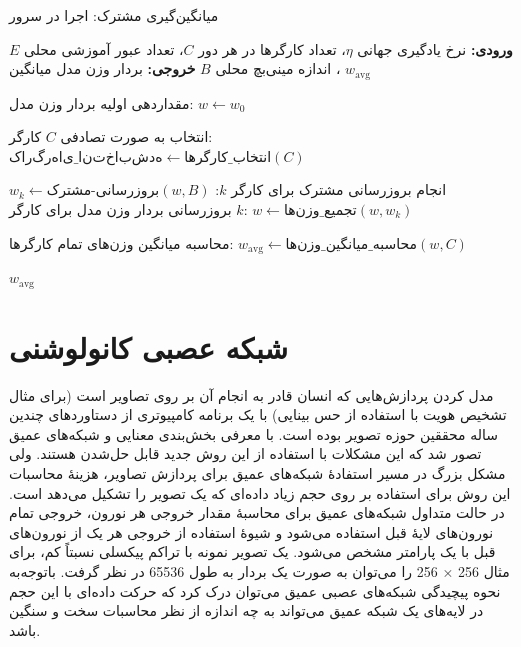       \begin{algorithm}[H]
          \caption{میانگین‌گیری مشترک: اجرا در سرور}
          \label{alg:federated_averaging}
          \begin{algorithmic}[1]
              \State \textbf{ورودی:} نرخ یادگیری جهانی $\eta$، تعداد کارگر‌ها در هر دور $C$، تعداد عبور آموزشی محلی $E$، اندازه مینی‌بچ محلی $B$
              \State \textbf{خروجی:} بردار وزن مدل میانگین $w_{\text{avg}}$
              
                  \State مقداردهی اولیه بردار وزن مدل: $w \gets w_0$
                  
                   
                      \State انتخاب به صورت تصادفی $C$ کارگر: $کارگر‌های\_انتخاب‌شده \gets \text{انتخاب\_کارگر‌ها}(C)$
                      
                          \State انجام بروزرسانی مشترک برای کارگر $k$: $w_k \gets \text{بروزرسانی-مشترک}(w, B)$
                          \State بروزرسانی بردار وزن مدل برای کارگر $k$: $w \gets \text{تجمیع\_وزن‌ها}(w, w_k)$
                      \EndFor
                      
                      \State محاسبه میانگین وزن‌های تمام کارگر‌ها: $w_{\text{avg}} \gets \text{محاسبه\_میانگین\_وزن‌ها}(w, C)$
                  \EndFor
                  
                  \State \Return $w_{\text{avg}}$
              \EndFunction
          \end{algorithmic}
      \end{algorithm}
      
\section{شبکه عصبی کانولوشنی}
مدل ‌کردن پردازش‌هایی که انسان قادر به انجام آن بر روی تصاویر است (برای مثال تشخیص هویت با استفاده از حس بینایی) با یک برنامه کامپیوتری از دستاورد‌های چندین ساله محققین حوزه تصویر بوده است. با معرفی بخش‌بندی معنایی و شبکه‌های عمیق تصور شد که این مشکلات با استفاده از این روش جدید قابل حل‌شدن هستند. ولی مشکل بزرگ در مسیر استفادهٔ شبکه‌های عمیق برای پردازش تصاویر، هزینهٔ محاسبات این روش برای استفاده بر روی حجم زیاد داده‌ای که یک تصویر را تشکیل می‌دهد است. در حالت متداول شبکه‌های عمیق برای محاسبهٔ مقدار خروجی هر نورون، خروجی تمام نورون‌های لایهٔ قبل استفاده می‌شود و شیوهٔ استفاده از خروجی هر یک از نورون‌های قبل با یک پارامتر مشخص می‌شود. یک تصویر نمونه با تراکم پیکسلی نسبتاً کم، برای مثال 256 × 256 را می‌توان به صورت یک بردار به طول 65536 در نظر گرفت. باتوجه‌به نحوه پیچیدگی شبکه‌های عصبی عمیق می‌توان درک کرد که حرکت داده‌ای با این حجم در لایه‌های یک شبکه عمیق می‌تواند به چه اندازه از نظر محاسبات سخت و سنگین باشد.

